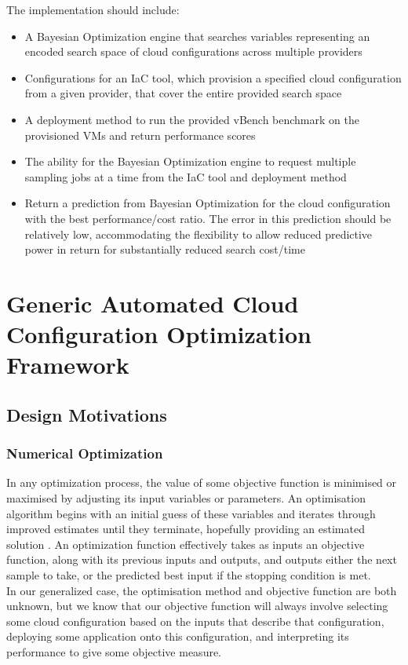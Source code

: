 \documentclass{report}
\begin{document}
The implementation should include:
\begin{itemize}
\singlespacing
\item A Bayesian Optimization engine that searches variables representing an encoded search space of cloud configurations across multiple providers
\item Configurations for an IaC tool, which provision a specified cloud configuration from a given provider, that cover the entire provided search space
\item A deployment method to run the provided vBench benchmark on the provisioned VMs and return performance scores
\item The ability for the Bayesian Optimization engine to request multiple sampling jobs at a time from the IaC tool and deployment method
\item Return a prediction from Bayesian Optimization for the cloud configuration with the best performance/cost ratio. The error in this prediction should be relatively low, accommodating the flexibility to allow reduced predictive power in return for substantially reduced search cost/time
\end{itemize}

\chapter{Generic Automated Cloud Configuration Optimization Framework}
\section{Design Motivations}
\subsection{Numerical Optimization}
In any optimization process, the value of some objective function is minimised or maximised by adjusting its input variables or parameters. An optimisation algorithm begins with an initial guess of these variables and iterates through improved estimates until they terminate, hopefully providing an estimated solution \cite{Nocedal2006}. An optimization function effectively takes as inputs an objective function, along with its previous inputs and outputs, and outputs either the next sample to take, or the predicted best input if the stopping condition is met. \\
In our generalized case, the optimisation method and objective function are both unknown, but we know that our objective function will always involve selecting some cloud configuration based on the inputs that describe that configuration, deploying some application onto this configuration, and interpreting its performance to give some objective measure.
 
\end{document}
